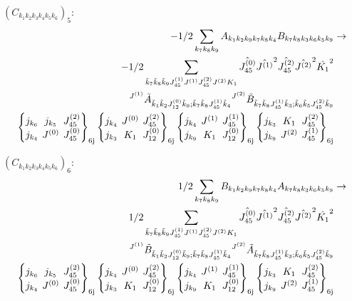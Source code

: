 \documentclass[11pt]{article}
\newcommand{\sixj}[6]{\begingroup\setlength{\arraycolsep}{0.2em}\begin{Bmatrix} #1 & #2 & #3 \\ #4 & #5 & #6 \end{Bmatrix}_{\text{6j}}\endgroup}
\begin{document}
$\left({C}_{{k}_{1}{k}_{2}{k}_{3}{k}_{4}{k}_{5}{k}_{6}}\right)_{5}$:
\begin{align}
-1/2\sum_{{k}_{7}{k}_{8}{k}_{9}}{A}_{{k}_{1}{k}_{2}{k}_{9}{k}_{7}{k}_{8}{k}_{4}}{B}_{{k}_{7}{k}_{8}{k}_{3}{k}_{6}{k}_{5}{k}_{9}}&\rightarrow \notag \\-1/2\sum_{\tilde{k}_{7}\tilde{k}_{8}\tilde{k}_{9}J^{(1)}_{45}J^{(1)}J^{(2)}_{45}J^{(2)}K_{1}}\hat{J^{(0)}_{45}}\hat{J^{(1)}}^{2}\hat{J^{(2)}_{45}}\hat{J^{(2)}}^{2}\hat{K_{1}}^{2}& \notag \\{}^{J^{(1)}}\tilde{A}_{\tilde{k}_{1}\tilde{k}_{2}J^{(0)}_{12}\tilde{k}_{9};\tilde{k}_{7}\tilde{k}_{8}J^{(1)}_{45}\tilde{k}_{4}}{}^{J^{(2)}}\tilde{B}_{\tilde{k}_{7}\tilde{k}_{8}J^{(1)}_{45}\tilde{k}_{3};\tilde{k}_{6}\tilde{k}_{5}J^{(2)}_{45}\tilde{k}_{9}}& \notag \\\sixj{j_{{k}_{6}}}{j_{{k}_{5}}}{J^{(2)}_{45}}{j_{{k}_{4}}}{J^{(0)}}{J^{(0)}_{45}}\sixj{j_{{k}_{4}}}{J^{(0)}}{J^{(2)}_{45}}{j_{{k}_{3}}}{K_{1}}{J^{(0)}_{12}}\sixj{j_{{k}_{4}}}{J^{(1)}}{J^{(1)}_{45}}{j_{{k}_{9}}}{K_{1}}{J^{(0)}_{12}}\sixj{j_{{k}_{3}}}{K_{1}}{J^{(2)}_{45}}{j_{{k}_{9}}}{J^{(2)}}{J^{(1)}_{45}}
\end{align}

$\left({C}_{{k}_{1}{k}_{2}{k}_{3}{k}_{4}{k}_{5}{k}_{6}}\right)_{6}$:
\begin{align}
1/2\sum_{{k}_{7}{k}_{8}{k}_{9}}{B}_{{k}_{1}{k}_{2}{k}_{9}{k}_{7}{k}_{8}{k}_{4}}{A}_{{k}_{7}{k}_{8}{k}_{3}{k}_{6}{k}_{5}{k}_{9}}&\rightarrow \notag \\1/2\sum_{\tilde{k}_{7}\tilde{k}_{8}\tilde{k}_{9}J^{(1)}_{45}J^{(1)}J^{(2)}_{45}J^{(2)}K_{1}}\hat{J^{(0)}_{45}}\hat{J^{(1)}}^{2}\hat{J^{(2)}_{45}}\hat{J^{(2)}}^{2}\hat{K_{1}}^{2}& \notag \\{}^{J^{(1)}}\tilde{B}_{\tilde{k}_{1}\tilde{k}_{2}J^{(0)}_{12}\tilde{k}_{9};\tilde{k}_{7}\tilde{k}_{8}J^{(1)}_{45}\tilde{k}_{4}}{}^{J^{(2)}}\tilde{A}_{\tilde{k}_{7}\tilde{k}_{8}J^{(1)}_{45}\tilde{k}_{3};\tilde{k}_{6}\tilde{k}_{5}J^{(2)}_{45}\tilde{k}_{9}}& \notag \\\sixj{j_{{k}_{6}}}{j_{{k}_{5}}}{J^{(2)}_{45}}{j_{{k}_{4}}}{J^{(0)}}{J^{(0)}_{45}}\sixj{j_{{k}_{4}}}{J^{(0)}}{J^{(2)}_{45}}{j_{{k}_{3}}}{K_{1}}{J^{(0)}_{12}}\sixj{j_{{k}_{4}}}{J^{(1)}}{J^{(1)}_{45}}{j_{{k}_{9}}}{K_{1}}{J^{(0)}_{12}}\sixj{j_{{k}_{3}}}{K_{1}}{J^{(2)}_{45}}{j_{{k}_{9}}}{J^{(2)}}{J^{(1)}_{45}}
\end{align}
\end{document}

